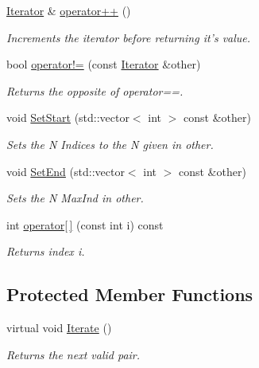 \begin{DoxyCompactItemize}
\hyperlink{classJKBuilder_1_1Iterator}{Iterator} \& \hyperlink{classJKBuilder_1_1Iterator_ae1f21c74128a5ef5d1b9de72ceb09be8}{operator++} ()
\begin{DoxyCompactList}\small\item\em Increments the iterator before returning it's value. \item\end{DoxyCompactList}\item 
bool \hyperlink{classJKBuilder_1_1Iterator_a8c06af8ae0d9d1614ae9f81629275926}{operator!=} (const \hyperlink{classJKBuilder_1_1Iterator}{Iterator} \&other)
\begin{DoxyCompactList}\small\item\em Returns the opposite of operator==. \item\end{DoxyCompactList}\item 
void \hyperlink{classJKBuilder_1_1Iterator_aa83de505e29125c1d3ac7bb1b13ca15a}{SetStart} (std::vector$<$ int $>$ const \&other)
\begin{DoxyCompactList}\small\item\em Sets the N Indices to the N given in other. \item\end{DoxyCompactList}\item 
void \hyperlink{classJKBuilder_1_1Iterator_aad84ec668b5f41210db34c540aaa31fc}{SetEnd} (std::vector$<$ int $>$ const \&other)
\begin{DoxyCompactList}\small\item\em Sets the N MaxInd in other. \item\end{DoxyCompactList}\item 
int \hyperlink{classJKBuilder_1_1Iterator_a74247cf730a06b23fcb1ec64e5596b25}{operator\mbox{[}$\,$\mbox{]}} (const int i) const 
\begin{DoxyCompactList}\small\item\em Returns index i. \item\end{DoxyCompactList}\end{DoxyCompactItemize}
\subsection*{Protected Member Functions}
\begin{DoxyCompactItemize}
\item 
virtual void \hyperlink{classJKBuilder_1_1PairIterator_a7874a07e98b52f4f147cde6f39353bae}{Iterate} ()
\begin{DoxyCompactList}\small\item\em Returns the next valid pair. \item\end{DoxyCompactList}\end{DoxyCompactItemize}
